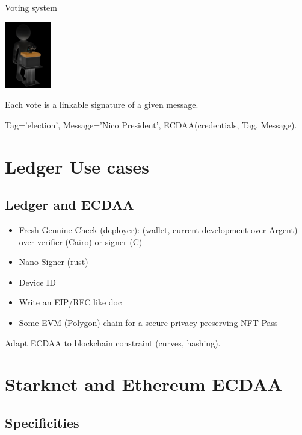 \documentclass[aspectratio=43]{beamer}
\begin{document}
\begin{frame}{Voting system}

\begin{center}
\includegraphics[width=2cm]{images/vote.jpg}
\end{center}

Each vote is a linkable signature of a given message.

Tag='election', Message='Nico President', ECDAA(credentials, Tag, Message).

\end{frame}

\section{Ledger Use cases}
\subsection{Ledger and ECDAA}
\begin{frame}


\begin{itemize}
\item Fresh Genuine Check (deployer): (wallet, current development over Argent) over verifier (Cairo) or signer (C)
\item Nano Signer (rust)
\item Device ID
\item Write an EIP/RFC like doc 
\item Some EVM (Polygon) chain for a secure privacy-preserving NFT Pass
\end{itemize} 


Adapt ECDAA to blockchain constraint (curves, hashing).

\end{frame}
\section{Starknet and Ethereum ECDAA}
\subsection{Specificities}
\end{document}
